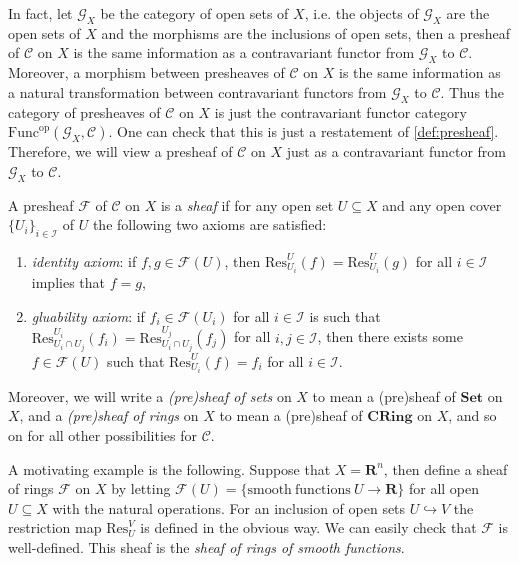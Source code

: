 \documentclass[11pt]{book}
\begin{document}
In fact, let $\mathcal{G}_X$ be the category of open sets of $X$, i.e. the objects of $\mathcal{G}_X$ are the open sets of $X$ and the morphisms are the inclusions of open sets, then a presheaf of $\mathcal C$ on $X$ is the same information as a contravariant functor from $\mathcal{G}_X$ to $\mathcal C$. Moreover, a morphism between presheaves of $\mathcal C$ on $X$ is the same information as a natural transformation between contravariant functors from $\mathcal{G}_X$ to $\mathcal C$. Thus the category of presheaves of $\mathcal C$ on $X$ is just the contravariant functor category $\mathrm{Func}^{\mathrm{op}}(\mathcal{G}_X,\mathcal C)$. One can check that this is just a restatement of \autoref{def:presheaf}. Therefore, we will view a presheaf of $\mathcal C$ on $X$ just as a contravariant functor from $\mathcal{G}_X$ to $\mathcal C$. 
\begin{definition}A presheaf $\mathscr{F}$ of $\mathcal C$ on $X$ is a \textit{sheaf} if for any open set $U\subseteq X$ and any open cover $\{U_i\}_{i\in\mathcal{I}}$ of $U$ the following two axioms are satisfied:
\begin{enumerate}[label=(\roman*)]
	\item \textit{identity axiom}: if $f,g\in\mathscr{F}(U)$, then $\mathrm{Res}^U_{U_i}(f)=\mathrm{Res}^U_{U_i}(g)$ for all $i\in\mathcal{I}$ implies that $f=g$, 
	\item \textit{gluability axiom}: if $f_i\in \mathscr{F}(U_i)$ for all $i\in\mathcal{I}$ is such that $\mathrm{Res}^{U_i}_{U_i\cap U_j}(f_i)=\mathrm{Res}^{U_j}_{U_i\cap U_j}(f_j)$ for all $i,j\in\mathcal{I}$, then there exists some $f\in\mathscr{F}(U)$ such that $\mathrm{Res}^U_{U_i}(f)=f_i$ for all $i\in\mathcal{I}$.
\end{enumerate}
Moreover, we will write a \textit{(pre)sheaf of sets} on $X$ to mean a (pre)sheaf of $\mathbf{Set}$ on $X$, and a \textit{(pre)sheaf of rings} on $X$ to mean a (pre)sheaf of $\mathbf{CRing}$ on $X$, and so on for all other possibilities for $\mathcal C$.
\end{definition}
\begin{example}A motivating example is the following. Suppose that $X=\mathbf R^n$, then define a sheaf of rings $\mathscr{F}$ on $X$ by letting $\mathscr{F}(U)=\{\mathrm{smooth\ functions\ }U\rightarrow \mathbf R\}$ for all open $U\subseteq X$ with the natural operations. For an inclusion of open sets $U\hookrightarrow V$ the restriction map $\mathrm{Res}^V_U$ is defined in the obvious way. We can easily check that $\mathscr{F}$ is well-defined. This sheaf is the \textit{sheaf of rings of smooth functions}.
\end{example}
\end{document}
